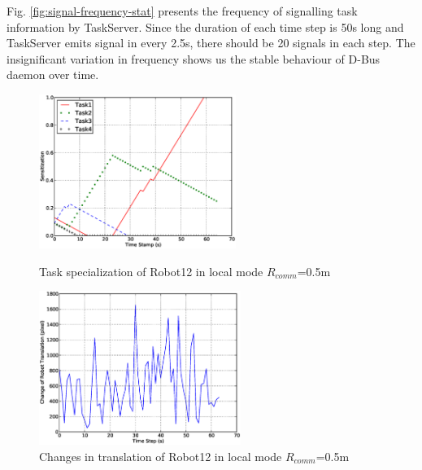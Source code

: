 \documentclass[letterpaper, 10 pt, conference]{ieeeconf}  %
\begin{document}
%
Fig. \ref{fig:signal-frequency-stat} presents the frequency of signalling task information by TaskServer. Since the duration of each time step is 50s long and TaskServer emits signal in every 2.5s, there should be 20 signals in each step. The insignificant variation in frequency shows us the stable behaviour of D-Bus daemon over time.
%
\begin{figure}
\begin{minipage}[t]{0.5\linewidth}
\centering
\includegraphics[height=5cm, angle=0]{images/local-500cm/PlotRobot12-Sensitizations-2010Feb16-150432.eps}
\caption{\small Task specialization of Robot12 in local mode $R_{comm}$=0.5m}
\label{fig:single-robot-sensitizations} %
\end{minipage} 
\begin{minipage}[t]{0.5\linewidth}
\centering
\includegraphics[height=5cm, angle=0]{images/local-500cm/DeltaRobot12-PoseAtTS-2010Feb16-150432.eps}
\caption{\small Changes in translation of Robot12 in local mode $R_{comm}$=0.5m}
\label{fig:single-robot-translation} %
\end{minipage}
\end{figure}
\end{document}
